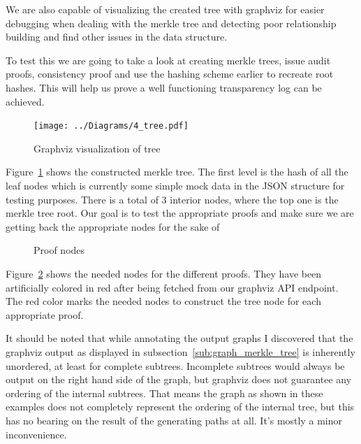 \documentclass[../Main/thesis.tex]{subfiles}
\begin{document}
We are also capable of visualizing the created tree with graphviz for easier
debugging when dealing with the merkle tree and detecting poor relationship
building and find other issues in the data structure.

To test this we are going to take a look at creating merkle trees, issue audit
proofs, consistency proof and use the hashing scheme earlier to recreate root
hashes. This will help us prove a well functioning transparency log can be
achieved.

\begin{figure}[H]
\centering
\texttt{[image: ../Diagrams/4\_tree.pdf]}
\caption{Graphviz visualization of tree}
\label{fig:graph}
\end{figure}


Figure~\ref{fig:graph} shows the constructed merkle tree. The first level is the
hash of all the leaf nodes which is currently some simple mock data in the JSON
structure for testing purposes. There is a total of 3 interior nodes, where the
top one is the merkle tree root. Our goal is to test the appropriate proofs and
make sure we are getting back the appropriate nodes for the sake of 

\begin{figure}[H]
\centering
{}
\qquad
{}
\caption{Proof nodes}
\label{fig:test_proof}
\end{figure}

Figure~\ref{fig:test_proof} shows the needed nodes for the different proofs.
They have been artificially colored in red after being fetched from our graphviz
API endpoint. The red color marks the needed nodes to construct the tree node
for each appropriate proof. 

It should be noted that while annotating the output graphs I discovered that the graphviz
output as displayed in subsection~\ref{sub:graph_merkle_tree} is inherently
unordered, at least for complete subtrees. Incomplete subtrees would always be
output on the right hand side of the graph, but graphviz does not guarantee
any ordering of the internal subtrees. That means the graph as shown in these
examples does not completely represent the ordering of the internal tree, but
this has no bearing on the result of the generating paths at all. It's mostly a
minor inconvenience.
\end{document}
